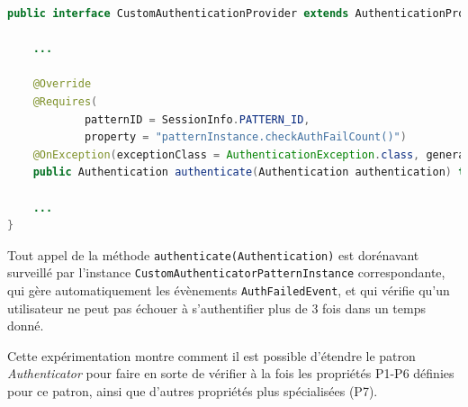 \begin{lstlisting}[language=Java,basicstyle=\ttfamily\footnotesize, caption=Définition de la propriété temporelle,label=listing:TemporalPropertyDefinition]
public interface CustomAuthenticationProvider extends AuthenticationProvider {

    ...
    
	@Override
	@Requires(
			patternID = SessionInfo.PATTERN_ID,
			property = "patternInstance.checkAuthFailCount()")
	@OnException(exceptionClass = AuthenticationException.class, generateEvent = AuthFailEvent.class)
    public Authentication authenticate(Authentication authentication) throws AuthenticationException;

    ...
}
\end{lstlisting}

Tout appel de la méthode \texttt{authenticate(Authentication)} est dorénavant surveillé par l'instance \texttt{CustomAuthenticatorPatternInstance} correspondante, qui gère automatiquement les évènements \texttt{AuthFailedEvent}, et qui vérifie qu'un utilisateur ne peut pas échouer à s'authentifier plus de 3 fois dans un temps donné. 

Cette expérimentation montre comment il est possible d'étendre le patron \textit{Authenticator} pour faire en sorte de vérifier à la fois les propriétés P1-P6 définies pour ce patron, ainsi que d'autres propriétés plus spécialisées (P7).


